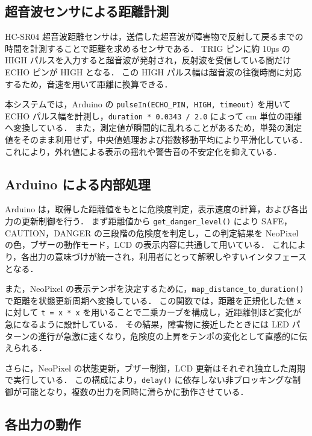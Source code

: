\documentclass[a4paper,fontsize=11pt,line_length=40zw,number_of_lines=35,baselineskip=1.7zw]{jlreq}
\begin{document}
\subsection{超音波センサによる距離計測}

HC-SR04 超音波距離センサは，送信した超音波が障害物で反射して戻るまでの時間を計測することで距離を求めるセンサである．
TRIG ピンに約 10µs の HIGH パルスを入力すると超音波が発射され，反射波を受信している間だけ ECHO ピンが HIGH となる\cite{iteadstudio2010UltrasonicRangingModule}．
この HIGH パルス幅は超音波の往復時間に対応するため，音速を用いて距離に換算できる\cite{iteadstudio2010UltrasonicRangingModule}．

本システムでは，Arduino の \lstinline|pulseIn(ECHO_PIN, HIGH, timeout)| を用いて ECHO パルス幅を計測し，\lstinline|duration * 0.0343 / 2.0| によって cm 単位の距離へ変換している\cite{arduinodocumentationteam2025PulseIn,iteadstudio2010UltrasonicRangingModule}．
また，測定値が瞬間的に乱れることがあるため，単発の測定値をそのまま利用せず，中央値処理および指数移動平均により平滑化している．
これにより，外れ値による表示の揺れや警告音の不安定化を抑えている．

\subsection{Arduino による内部処理}

Arduino は，取得した距離値をもとに危険度判定，表示速度の計算，および各出力の更新制御を行う．
まず距離値から \lstinline|get_danger_level()| により SAFE，CAUTION，DANGER の三段階の危険度を判定し，この判定結果を NeoPixel の色，ブザーの動作モード，LCD の表示内容に共通して用いている．
これにより，各出力の意味づけが統一され，利用者にとって解釈しやすいインタフェースとなる．

また，NeoPixel の表示テンポを決定するために，\lstinline|map_distance_to_duration()| で距離を状態更新周期へ変換している．
この関数では，距離を正規化した値 \lstinline|x| に対して \lstinline|t = x * x| を用いることで二乗カーブを構成し，近距離側ほど変化が急になるように設計している．
その結果，障害物に接近したときには LED パターンの進行が急激に速くなり，危険度の上昇をテンポの変化として直感的に伝えられる．

さらに，NeoPixel の状態更新，ブザー制御，LCD 更新はそれぞれ独立した周期で実行している．
この構成により，\lstinline|delay()| に依存しない非ブロッキングな制御が可能となり，複数の出力を同時に滑らかに動作させている．

\subsection{各出力の動作}
\end{document}
